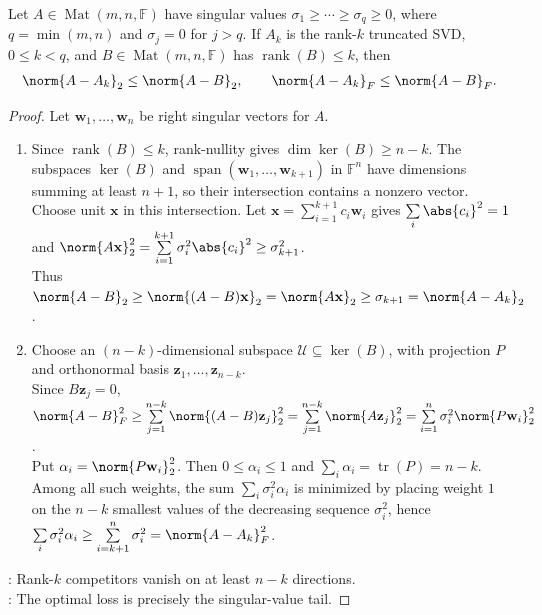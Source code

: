\begin{theorem} \label{thm:eckart-young-frobenius-spectral} \\
Let $A\in\operatorname{Mat}(m,n,\mathbb{F})$ have singular values $\sigma_1\geq\cdots\geq\sigma_q\geq0$, where $q=\min(m,n)$ and $\sigma_j=0$ for $j>q$. If $A_k$ is the rank-$k$ truncated SVD, $0\leq k<q$, and $B\in\operatorname{Mat}(m,n,\mathbb{F})$ has $\operatorname{rank}(B)\leq k$, then
\begin{align}
\norm{A-A_k}_2\leq\norm{A-B}_2,
\qquad
\norm{A-A_k}_F\leq\norm{A-B}_F.
\nonumber
\end{align}
\begin{proof}
Let $\mathbf{w}_1,\ldots,\mathbf{w}_n$ be right singular vectors for $A$.
\begin{enumerate}[label=\roman*.]
\setlength{\itemsep}{0pt}
\item Since $\operatorname{rank}(B)\leq k$, rank-nullity gives $\dim\ker(B)\geq n-k$. The subspaces $\ker(B)$ and $\operatorname{span}(\mathbf{w}_1,\ldots,\mathbf{w}_{k+1})$ in $\mathbb{F}^n$ have dimensions summing at least $n+1$, so their intersection contains a nonzero vector.\\
Choose unit $\mathbf{x}$ in this intersection. Let $\mathbf{x}=\sum\limits_{i=1}^{k+1}c_i\mathbf{w}_i$ gives $\sum\limits_i\abs{c_i}^2=1$ and $\norm{A\mathbf{x}}_2^2=\sum\limits_{i=1}^{k+1}\sigma_i^2\abs{c_i}^2\geq\sigma_{k+1}^2$.\\
Thus $\norm{A-B}_2\geq\norm{(A-B)\mathbf{x}}_2=\norm{A\mathbf{x}}_2\geq\sigma_{k+1}=\norm{A-A_k}_2$.
\item Choose an $(n-k)$-dimensional subspace $\mathcal{U}\subseteq\ker(B)$, with projection $P$ and orthonormal basis $\mathbf{z}_1,\ldots,\mathbf{z}_{n-k}$.\\
Since $B\mathbf{z}_j=0$, $\norm{A-B}_F^2\geq\sum\limits_{j=1}^{n-k}\norm{(A-B)\mathbf{z}_j}_2^2=\sum\limits_{j=1}^{n-k}\norm{A\mathbf{z}_j}_2^2=\sum\limits_{i=1}^{n}\sigma_i^2\norm{P\mathbf{w}_i}_2^2$.\\
Put $\alpha_i=\norm{P\mathbf{w}_i}_2^2$. Then $0\leq\alpha_i\leq1$ and $\sum_i\alpha_i=\operatorname{tr}(P)=n-k$.\\
Among all such weights, the sum $\sum_i\sigma_i^2\alpha_i$ is minimized by placing weight $1$ on the $n-k$ smallest values of the decreasing sequence $\sigma_i^2$, hence $\sum\limits_i\sigma_i^2\alpha_i\geq\sum\limits_{i=k+1}^{n}\sigma_i^2=\norm{A-A_k}_F^2$.
\end{enumerate}
: Rank-$k$ competitors vanish on at least $n-k$ directions.\\
: The optimal loss is precisely the singular-value tail.
\end{proof}
\end{theorem}

